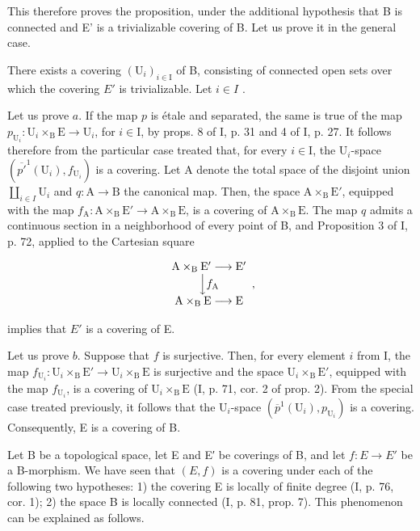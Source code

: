 This therefore proves the proposition, under the additional hypothesis that B is connected and E' is a trivializable covering of B. Let us prove it in the general case.

There exists a covering \((\mathrm{U}_{i})_{i\in\mathrm{I}}\) of B, consisting of connected open sets over which the covering \(E'\) is trivializable. Let \(i\in I\) .

Let us prove \(a\). If the map \(p\) is étale and separated, the same is true of the map \(p_{\mathrm{U}_i}\colon \mathrm{U}_i\times_{\mathrm{B}}\mathrm{E}\to \mathrm{U}_i\), for \(i\in \mathrm{I}\), by props. 8 of I, p. 31 and 4 of I, p. 27. It follows therefore from the particular case treated that, for every \(i\in \mathrm{I}\), the \(\mathrm{U}_i\)-space \((\overline{p'}^{1}(\mathrm{U}_i),f_{\mathrm{U}_i})\) is a covering. Let A denote the total space of the disjoint union \(\coprod_{i\in I}\mathrm{U}_i\) and \(q\colon \mathrm{A}\to \mathrm{B}\) the canonical map. Then, the space \(\mathrm{A}\times_{\mathrm{B}}\mathrm{E}'\), equipped with the map \(f_{\mathrm{A}}\colon \mathrm{A}\times_{\mathrm{B}}\mathrm{E}'\to \mathrm{A}\times_{\mathrm{B}}\mathrm{E}\), is a covering of \(\mathrm{A}\times_{\mathrm{B}}\mathrm{E}\). The map \(q\) admits a continuous section in a neighborhood of every point of B, and Proposition 3 of I, p. 72, applied to the Cartesian square

\[
\begin{array}{c} \mathrm {A\times_ {B} E^ {\prime}} \longrightarrow \mathrm {E^ {\prime}} \\ \Big \downarrow f _ {\mathrm{A}} \\ \mathrm {A\times_ {B} E} \longrightarrow \mathrm{E} \end{array} ,
\]

implies that \(E'\) is a covering of E.

Let us prove \(b\). Suppose that \(f\) is surjective. Then, for every element \(i\) from I, the map \(f_{\mathrm{U}_i}\colon \mathrm{U}_i\times_{\mathrm{B}}\mathrm{E}'\to \mathrm{U}_i\times_{\mathrm{B}}\mathrm{E}\) is surjective and the space \(\mathrm{U}_i\times_{\mathrm{B}}\mathrm{E}'\), equipped with the map \(f_{\mathrm{U}_i}\), is a covering of \(\mathrm{U}_i\times_{\mathrm{B}}\mathrm{E}\) (I, p. 71, cor. 2 of prop. 2). From the special case treated previously, it follows that the \(\mathrm{U}_i\)-space \((\overline{p}^{1}(\mathrm{U}_{i}),p_{\mathrm{U}_{i}})\) is a covering. Consequently, E is a covering of B.

Let B be a topological space, let E and E′ be coverings of B, and let \(f: E \rightarrow E'\) be a B-morphism. We have seen that \((E, f)\) is a covering under each of the following two hypotheses: 1) the covering E is locally of finite degree (I, p. 76, cor. 1); 2) the space B is locally connected (I, p. 81, prop. 7). This phenomenon can be explained as follows.


